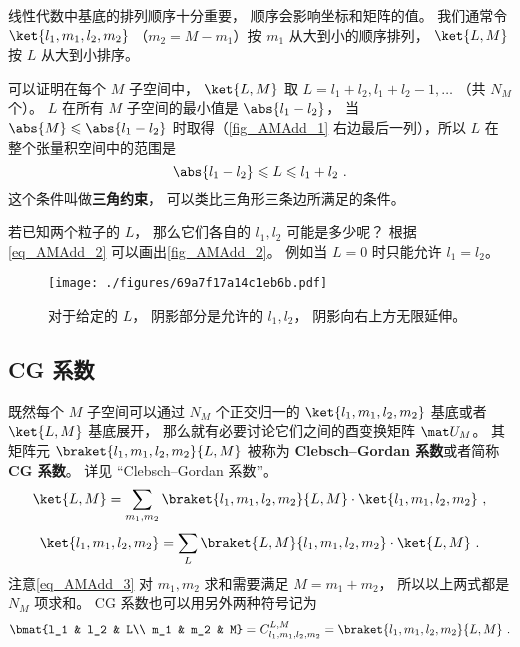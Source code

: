 线性代数中基底的排列顺序十分重要， 顺序会影响坐标和矩阵的值。 我们通常令 $\ket{l_1, m_1, l_2, m_2}$ （$m_2 = M - m_1$）按 $m_1$ 从大到小的顺序排列， $\ket{L, M}$ 按 $L$ 从大到小排序。

可以证明在每个 $M$ 子空间中， $\ket{L, M}$ 取 $L = l_1 + l_2, l_1 + l_2 - 1,\dots$ （共 $N_M$ 个）。 %
$L$ 在所有 $M$ 子空间的最小值是 $\abs{l_1 - l_2}$， 当 $\abs{M} \leqslant \abs{l_1 - l_2}$ 时取得（\autoref{fig_AMAdd_1} 右边最后一列），所以 $L$ 在整个张量积空间中的范围是
\begin{equation}\label{eq_AMAdd_2}
\abs{l_1 - l_2} \leqslant L \leqslant l_1 + l_2~.
\end{equation}
这个条件叫做\textbf{三角约束}， 可以类比三角形三条边所满足的条件。

若已知两个粒子的 $L$， 那么它们各自的 $l_1, l_2$ 可能是多少呢？ 根据\autoref{eq_AMAdd_2} 可以画出\autoref{fig_AMAdd_2}。 例如当 $L = 0$ 时只能允许 $l_1 = l_2$。
\begin{figure}[ht]
\centering
\texttt{[image: ./figures/69a7f17a14c1eb6b.pdf]}
\caption{对于给定的 $L$， 阴影部分是允许的 $l_1, l_2$， 阴影向右上方无限延伸。} \label{fig_AMAdd_2}
\end{figure}

\subsection{CG 系数}
既然每个 $M$ 子空间可以通过 $N_M$ 个正交归一的 $\ket{l_1, m_1, l_2, m_2}$ 基底或者 $\ket{L,M}$ 基底展开， 那么就有必要讨论它们之间的酉变换矩阵 $\mat U_M$。 其矩阵元 $\braket{l_1, m_1, l_2, m_2}{L, M}$ 被称为 \textbf{Clebsch–Gordan 系数}或者简称 \textbf{CG 系数}。 详见 “Clebsch–Gordan 系数”。
\begin{equation}\label{eq_AMAdd_3}
\ket{L, M} = \sum_{m_1, m_2}\braket{l_1, m_1, l_2, m_2}{L, M} \cdot \ket{l_1, m_1, l_2, m_2}~,
\end{equation}
\begin{equation}
\ket{l_1, m_1, l_2, m_2} = \sum_{L}\braket{L, M}{l_1, m_1, l_2, m_2} \cdot \ket{L, M}~.
\end{equation}
注意\autoref{eq_AMAdd_3} 对 $m_1,m_2$ 求和需要满足 $M = m_1 + m_2$， 所以以上两式都是 $N_M$ 项求和。 CG 系数也可以用另外两种符号记为
\begin{equation}
\bmat{l_1 & l_2 & L\\ m_1 & m_2 & M} = C_{l_1, m_1, l_2, m_2}^{L, M} = \braket{l_1, m_1, l_2, m_2}{L, M}~.
\end{equation}

